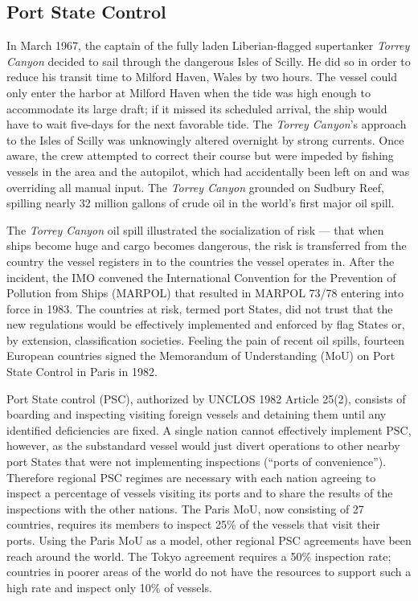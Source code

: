 \documentclass[twoside,symmetric,notoc]{tufte-book}
\begin{document}
\subsection{Port State Control}
\par{%
In March 1967, the captain of the fully laden Liberian-flagged supertanker \textit{Torrey Canyon} decided to sail through the dangerous Isles of Scilly. He did so in order to reduce his transit time to Milford Haven, Wales by two hours. The vessel could only enter the harbor at Milford Haven when the tide was high enough to accommodate its large draft;\cite[-1in]{Liberia} if it missed its scheduled arrival, the ship would have to wait five-days for the next favorable tide.\cite[-0.7in]{Hall} The \textit{Torrey Canyon}'s approach to the Isles of Scilly was unknowingly altered overnight by strong currents. Once aware, the crew attempted to correct their course but were impeded by fishing vessels in the area and the autopilot, which had accidentally been left on and was overriding all manual input. The \textit{Torrey Canyon} grounded on Sudbury Reef, spilling nearly 32 million gallons of crude oil in the world's first major oil spill.\cite{Cartner}
}
\par{%
The \textit{Torrey Canyon} oil spill illustrated the socialization of risk --- that when ships become huge and cargo becomes dangerous, the risk is transferred from the country the vessel registers in to the countries the vessel operates in.\cite{Crittenden} After the incident, the IMO convened the International Convention for the Prevention of Pollution from Ships (MARPOL) that resulted in MARPOL 73/78 entering into force in 1983.\cite{Ozcayir} The countries at risk, termed port States, did not trust that the new regulations would be effectively implemented and enforced by flag States or, by extension, classification societies. Feeling the pain of recent oil spills, fourteen European countries signed the Memorandum of Understanding (MoU) on Port State Control in Paris in 1982.\cite{Ehlers}
}
\par{%
Port State control (PSC), authorized by UNCLOS 1982 Article 25(2), consists of boarding and inspecting visiting foreign vessels and detaining them until any identified deficiencies are fixed.\cite{Carioua} A single nation cannot effectively implement PSC, however, as the substandard vessel would just divert operations to other nearby port States that were not implementing inspections (``ports of convenience'').\cite{Palma} Therefore regional PSC regimes are necessary with each nation agreeing to inspect a percentage of vessels visiting its ports and to share the results of the inspections with the other nations. The Paris MoU, now consisting of 27 countries, requires its members to inspect 25\% of the vessels that visit their ports. Using the Paris MoU as a model, other regional PSC agreements have been reach around the world.\cite{Hare} The Tokyo agreement requires a 50\% inspection rate;\cite{Yang} countries in poorer areas of the world do not have the resources to support such a high rate and inspect only 10\% of vessels.\cite{MOU_indian}
}
\end{document}
